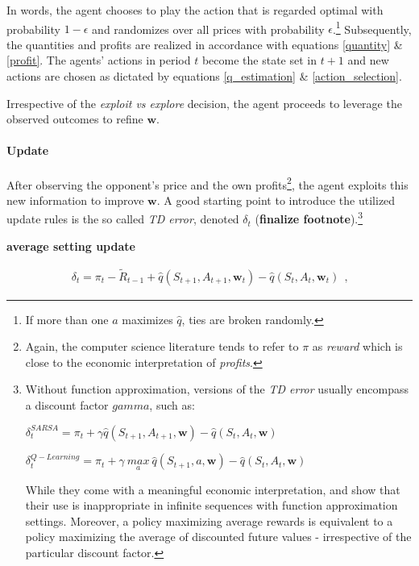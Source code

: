 In words, the agent chooses to play the action that is regarded optimal with probability $1-\epsilon$ and randomizes over all prices with probability $\epsilon$.\footnote{If more than one $a$ maximizes $\hat{q}$, ties are broken randomly.} Subsequently, the quantities and profits are realized in accordance with equations \ref{quantity} \& \ref{profit}. The agents' actions in period $t$ become the state set in $t+1$ and new actions are chosen as dictated by equations \ref{q_estimation} \& \ref{action_selection}.

Irrespective of the \emph{exploit vs explore} decision, the agent proceeds to leverage the observed outcomes to refine $\boldsymbol{w}$.



\paragraph{Update}

After observing the opponent's price and the own profits\footnote{Again, the computer science literature tends to refer to $\pi$ as \emph{reward} which is close to the economic interpretation of \emph{profits}.}, the agent exploits this new information to improve $\boldsymbol{w}$. A good starting point to introduce the utilized update rules is the so called \emph{TD error}, denoted $\delta_t$ (\textbf{finalize footnote}).\footnote{Without function approximation, versions of the \emph{TD error} usually encompass a discount factor $gamma$, such as:
	\begin{center}
		$\delta_t^{SARSA} = \pi_t + \gamma \hat{q}(S_{t+1}, A_{t+1}, \boldsymbol{w}) - \hat{q}(S_t, A_t, \boldsymbol{w})$
		
		$\delta_t^{Q-Learning} = \pi_t + \gamma ~ \underset{a}{max} ~ \hat{q}(S_{t+1}, a, \boldsymbol{w}) - \hat{q}(S_t, A_t, \boldsymbol{w})$
\end{center}
While they come with a meaningful economic interpretation, \textcite{sutton_reinforcement_2018} and \textcite{naik_discounted_2019} show that their use is inappropriate in infinite sequences with function approximation settings. Moreover, a policy maximizing average rewards is equivalent to a policy maximizing the average of discounted future values - irrespective of the particular discount factor.}

\textbf{average setting update}

\begin{gather}
	\delta_t = \pi_t -\widetilde{R}_{t-1} + \hat{q}(S_{t+1}, A_{t+1}, \boldsymbol{w}_t) - \hat{q}(S_t, A_t, \boldsymbol{w}_t) ~~   \text{,}
\end{gather}


